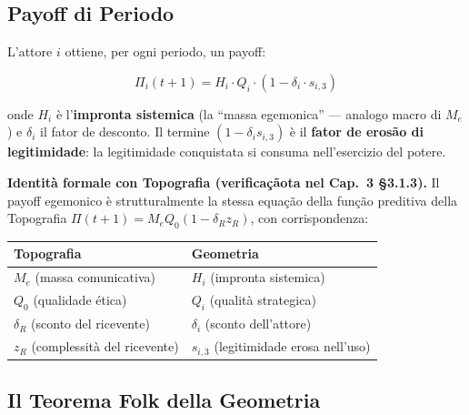 \subsection{Payoff di Periodo}\label{payoff-di-periodo}

L'attore \(i\) ottiene, per ogni periodo, un payoff:

\[
\Pi_i(t+1) = H_i \cdot Q_i \cdot (1 - \delta_i \cdot s_{i,3})
\]

onde \(H_i\) è l'\textbf{impronta sistemica} (la ``massa egemonica'' ---
analogo macro di \(M_e\)) e \(\delta_i\) il fator de desconto. Il
termine \((1 - \delta_i s_{i,3})\) è il \textbf{fator de erosão di
legitimidade}: la legitimidade conquistata si consuma nell'esercizio del
potere.

\Proved{} \textbf{Identità formale con Topografia (verificaçãota nel Cap.~3
\S{}3.1.3).} Il payoff egemonico è strutturalmente la stessa equação
della função preditiva della Topografia
\(\Pi(t+1) = M_e Q_0 (1 - \delta_R z_R)\), con corrispondenza:

{\def\LTcaptype{none} %
{\small\begin{longtable}[]{@{}
  >{\raggedright\arraybackslash}p{}
  >{\raggedright\arraybackslash}p{}@{}}
\toprule\noalign{}
\begin{minipage}[b]{\linewidth}\raggedright
Topografia
\end{minipage} & \begin{minipage}[b]{\linewidth}\raggedright
Geometria
\end{minipage} \\
\midrule\noalign{}
\endhead
\bottomrule\noalign{}
\endlastfoot
\(M_e\) (massa comunicativa) & \(H_i\) (impronta sistemica) \\
\(Q_0\) (qualidade ética) & \(Q_i\) (qualità strategica) \\
\(\delta_R\) (sconto del ricevente) & \(\delta_i\) (sconto
dell'attore) \\
\(z_R\) (complessità del ricevente) & \(s_{i,3}\) (legitimidade erosa
nell'uso) \\
\end{longtable}}
}

\subsection{Il Teorema Folk della
Geometria}\label{il-folk-theorem-della-geometria}

